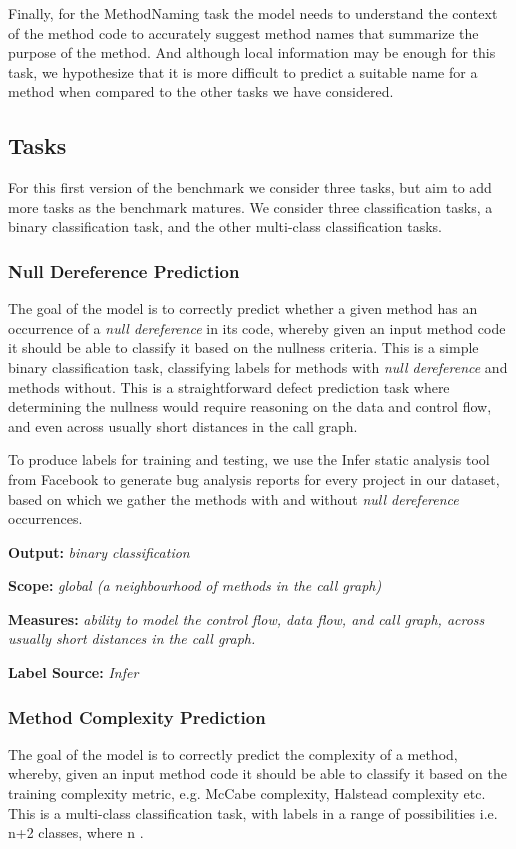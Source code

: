\documentclass[sigplan,review,anonymous]{acmart}\settopmatter{printfolios=true,printccs=false,printacmref=false}
\newcommand*{\field}[1]{\mathbb{#1}}
\begin{document}
Finally, for the MethodNaming task the model needs to understand the context of the method code to accurately suggest method names that summarize the purpose of the method. And although local information may be enough for this task, we hypothesize that it is more difficult to predict a suitable name for a method when compared to the other tasks we have considered.

\subsection{Tasks}
For this first version of the benchmark we consider three tasks, but aim to add more tasks as the benchmark matures. We consider three classification tasks, a binary classification task, and the other multi-class classification tasks. 

\subsubsection{Null Dereference Prediction}
The goal of the model is to correctly predict whether a given method has an occurrence of a \textit{null dereference} in its code, whereby given an input method code it should be able to classify it based on the nullness criteria. This is a simple binary classification task, classifying labels for methods with \textit{null dereference} and methods without. This is a straightforward defect prediction task where determining the nullness would require reasoning on the data and control flow, and even across usually short distances in the call graph. 

To produce labels for training and testing, we use the Infer static analysis tool from Facebook \cite{fbinfer} to generate bug analysis reports for every project in our dataset, based on which we gather the methods with and without \textit{null dereference} occurrences. \newline

\noindent
\textbf{Output:} \textit{binary classification}

\noindent
\textbf{Scope:} \textit{global (a neighbourhood of methods in the call graph)}

\noindent
\textbf{Measures:} \textit{ability to model the control flow, data flow, and call graph, across usually short distances in the call graph.}

\noindent
\textbf{Label Source:} \textit{Infer}

\subsubsection{Method Complexity Prediction}
The goal of the model is to correctly predict the complexity of a method, whereby, given an input method code it should be able to classify it based on the training complexity metric, e.g. McCabe complexity, Halstead complexity etc. This is a multi-class classification task, with labels in a range of possibilities i.e. n+2 classes, where n \in \field{N}.  
\end{document}
